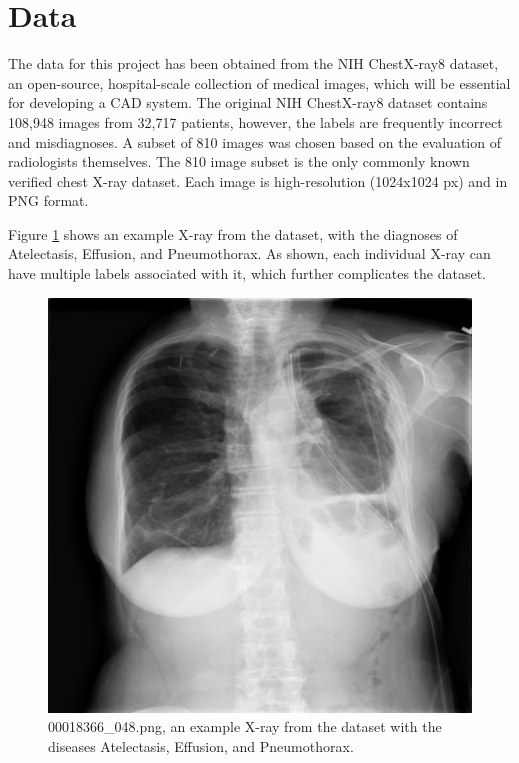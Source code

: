 \documentclass{article}
\theoremstyle{plain}
\theoremstyle{definition}
\theoremstyle{remark}
\begin{document}
\section{Data}
The data for this project has been obtained from the NIH ChestX-ray8 dataset, an open-source,
hospital-scale collection of medical images, which will be essential for developing a CAD system.
The original NIH ChestX-ray8 dataset contains 108,948 images from 32,717 patients, however, the
labels are frequently incorrect and misdiagnoses.
A subset of 810 images was chosen based on the evaluation of radiologists themselves. The 810 image
subset is the only commonly known verified chest X-ray dataset. Each image is high-resolution
(1024x1024 px) and in PNG format.

Figure \ref{fig:examplexray} shows an example X-ray from the dataset, with the diagnoses of
Atelectasis, Effusion, and Pneumothorax. As shown, each individual X-ray can have multiple labels
associated with it, which further complicates the dataset.

\begin{figure}[!h]
    \centering
    \includegraphics[scale=0.5]{00018366_048}
    \caption{00018366\_048.png, an example X-ray from the dataset with the diseases Atelectasis,
    Effusion, and Pneumothorax.}
    \label{fig:examplexray}
\end{figure}
\end{document}
